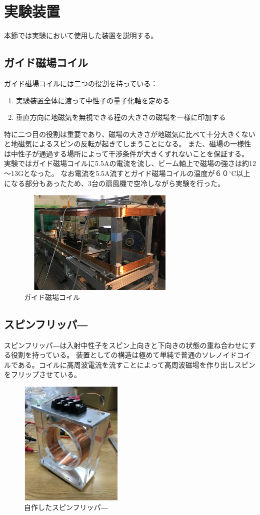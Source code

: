 \begingroup
\section{実験装置}
本節では実験において使用した装置を説明する。
\subsection{ガイド磁場コイル}
ガイド磁場コイルには二つの役割を持っている：

\begin{enumerate}
\item 実験装置全体に渡って中性子の量子化軸を定める
\item 垂直方向に地磁気を無視できる程の大きさの磁場を一様に印加する
\end{enumerate}

特に二つ目の役割は重要であり、磁場の大きさが地磁気に比べて十分大きくないと地磁気によるスピンの反転が起きてしまうことになる。
また、磁場の一様性は中性子が通過する場所によって干渉条件が大きくずれないことを保証する。
実験ではガイド磁場コイルに5.5Aの電流を流し、ビーム軸上で磁場の強さは約12～13Gとなった。
なお電流を5.5A流すとガイド磁場コイルの温度が６０$^\circ$C以上になる部分もあったため、3台の扇風機で空冷しながら実験を行った。

\begin{figure}[H]
\centering
\includegraphics[width=8cm,height=5cm]{device/coilphoto.pdf}\caption{ガイド磁場コイル}
\end{figure}
\subsection{スピンフリッパ―}
スピンフリッパ―は入射中性子をスピン上向きと下向きの状態の重ね合わせにする役割を持っている。
装置としての構造は極めて単純で普通のソレノイドコイルである。コイルに高周波電流を流すことによって高周波磁場を作り出しスピンをフリップさせている。
\begin{figure}[H]
\centering
\includegraphics[width=5cm,height=6cm]{device/spinflipperphoto.pdf}\caption{自作したスピンフリッパ―}
\end{figure}
